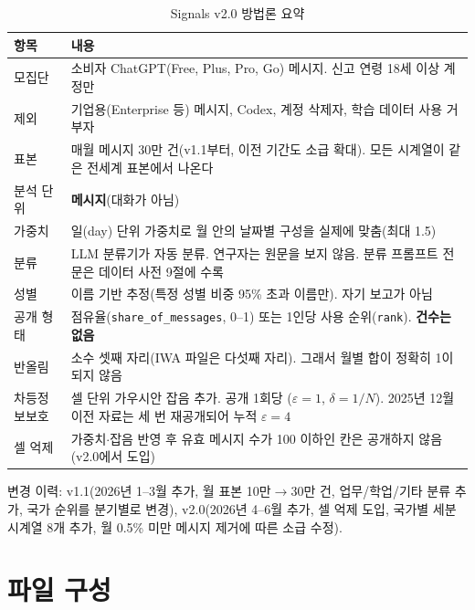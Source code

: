 \documentclass[11pt]{article}
\begin{document}
\begin{longtable}{L{3.0cm}L{11.6cm}}
\caption{Signals v2.0 방법론 요약}\label{tab:method}\\
\toprule
항목 & 내용 \\
\midrule
\endhead
모집단 & 소비자 ChatGPT(Free, Plus, Pro, Go) 메시지. 신고 연령 18세 이상 계정만 \\
제외 & 기업용(Enterprise 등) 메시지, Codex, 계정 삭제자, 학습 데이터 사용 거부자 \\
표본 & 매월 메시지 30만 건(v1.1부터, 이전 기간도 소급 확대). 모든 시계열이 같은 전세계 표본에서 나온다 \\
분석 단위 & \textbf{메시지}(대화가 아님) \\
가중치 & 일(day) 단위 가중치로 월 안의 날짜별 구성을 실제에 맞춤(최대 1.5) \\
분류 & LLM 분류기가 자동 분류. 연구자는 원문을 보지 않음. 분류 프롬프트 전문은 데이터 사전 9절에 수록 \\
성별 & 이름 기반 추정(특정 성별 비중 95\% 초과 이름만). 자기 보고가 아님 \\
공개 형태 & 점유율(\texttt{share\_of\_messages}, 0--1) 또는 1인당 사용 순위(\texttt{rank}). \textbf{건수는 없음} \\
반올림 & 소수 셋째 자리(IWA 파일은 다섯째 자리). 그래서 월별 합이 정확히 1이 되지 않음 \\
차등정보보호 & 셀 단위 가우시안 잡음 추가. 공개 1회당 ($\varepsilon=1$, $\delta=1/N$). 2025년 12월 이전 자료는 세 번 재공개되어 누적 $\varepsilon=4$ \\
셀 억제 & 가중치$\cdot$잡음 반영 후 유효 메시지 수가 100 이하인 칸은 공개하지 않음(v2.0에서 도입) \\
\bottomrule
\end{longtable}

변경 이력: v1.1(2026년 1--3월 추가, 월 표본 10만$\to$30만 건, 업무/학업/기타 분류 추가, 국가 순위를 분기별로 변경), v2.0(2026년 4--6월 추가, 셀 억제 도입, 국가별 세분 시계열 8개 추가, 월 0.5\% 미만 메시지 제거에 따른 소급 수정).

\section{파일 구성}
\end{document}
